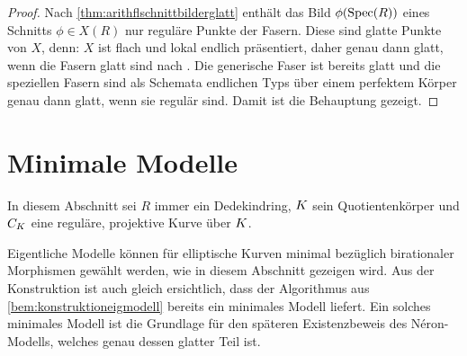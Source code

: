 \begin{Korollar}
\begin{proof}
    Nach \ref{thm:arithflschnittbilderglatt} enthält das Bild
    $\phi(\operatorname{Spec}(R))$ eines Schnitts $\phi\in X(R)$ nur reguläre
    Punkte der Fasern. Diese sind glatte Punkte von $X$, denn:
    $X$ ist flach und lokal endlich präsentiert, daher genau dann
    glatt, wenn die Fasern glatt sind nach
    \cite[8.5, Proposition 17]{bosch}.
    Die generische Faser ist bereits glatt und die speziellen Fasern
    sind als Schemata endlichen Typs über einem perfektem Körper
    genau dann glatt, wenn sie regulär sind.
    Damit ist die Behauptung gezeigt.
  \end{proof}
\end{Korollar}


\section{Minimale Modelle}\label{chap:minmodelle}
In diesem Abschnitt sei $R$ immer ein Dedekindring,
$K$ sein Quotientenkörper und $C_{K}$ eine
reguläre, projektive Kurve über $K$.

Eigentliche Modelle können für elliptische Kurven minimal
bezüglich birationaler Morphismen gewählt werden, wie in diesem
Abschnitt gezeigen wird. Aus der Konstruktion ist auch gleich ersichtlich,
dass der Algorithmus aus \ref{bem:konstruktioneigmodell} bereits ein
minimales Modell liefert.
Ein solches minimales Modell ist die Grundlage für den späteren
Existenzbeweis des Néron-Modells, welches genau dessen glatter Teil
ist.

